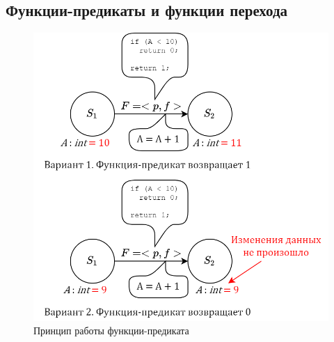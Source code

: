 \subsection{Функции-предикаты и функции перехода}
\begin{frame}
	\begin{figure}
		\begin{minipage}{0.49\textwidth}
			\centering
			\includegraphics[height=0.5\textheight]{images/illustration.predicate.png}
			\caption{Принцип работы функции-предиката}
		\end{minipage}\hfill\begin{minipage}{0.49\textwidth}
			\centering

\end{minipage}
\end{figure}
\end{frame}
